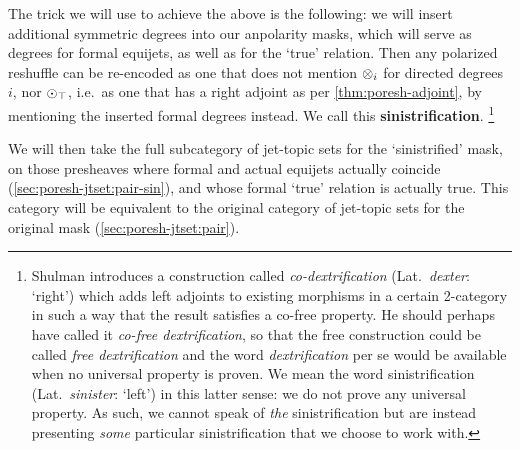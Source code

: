 \documentclass[a4paper]{memoir}
\begin{document}
{The trick we will use to achieve the above is the following: we will insert additional symmetric degrees into our anpolarity masks, which will serve as degrees for formal equijets, as well as for the `true' relation.
Then any polarized reshuffle can be re-encoded as one that does not mention ${\otimes}_i$ for directed degrees $i$, nor ${\odot}_\top$, i.e.\ as one that has a right adjoint as per \cref{thm:poresh-adjoint}, by mentioning the inserted formal degrees instead.
We call this \textbf{sinistrification}.%
\footnote{Shulman \cite{matt} introduces a construction called \emph{co-dextrification} (Lat.\ \emph{dexter}: `right') which adds left adjoints to existing morphisms in a certain 2-category in such a way that the result satisfies a co-free property. He should perhaps have called it \emph{co-free dextrification}, so that the free construction could be called \emph{free dextrification} and the word \emph{dextrification} per se would be available when no universal property is proven. We mean the word sinistrification (Lat.\ \emph{sinister}: `left') in this latter sense: we do not prove any universal property. As such, we cannot speak of \emph{the} sinistrification but are instead presenting \emph{some} particular sinistrification that we choose to work with.}

We will then take the full subcategory of jet-topic sets for the `sinistrified' mask, on those presheaves where formal and actual equijets actually coincide (\cref{sec:poresh-jtset:pair-sin}), and whose formal `true' relation is actually true.
This category will be equivalent to the original category of jet-topic sets for the original mask (\cref{sec:poresh-jtset:pair}).


\bigskip

}
\end{document}
